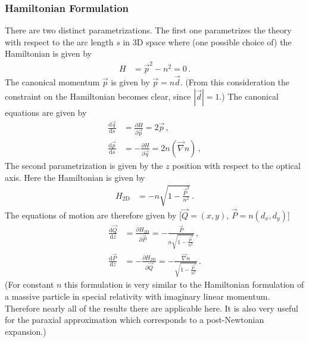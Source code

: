 \documentclass[12pt,a4paper,twoside,openright,BCOR10mm,headsepline,titlepage,abstracton,chapterprefix,final]{scrreprt}
\begin{document}
\subsubsection{Hamiltonian Formulation}
There are two distinct parametrizations. The first one parametrizes the theory with respect to the
arc length $s$ in 3D space where (one possible choice of) the Hamiltonian is given by
\begin{align}
 H &= \vec{p}^2 - n^2 = 0\,.
\end{align}
The canonical momentum $\vec{p}$ is given by $\vec{p} = n \vec{d}$. (From this consideration the constraint on
the Hamiltonian becomes clear, since $|\vec{d}| = 1$.) The canonical equations are given by
\begin{align}
 \frac{\text{d}\vec{q}}{\text{d}s} &= \frac{\partial H}{\partial \vec{p}} = 2 \vec{p}\,,\\
 \frac{\text{d}\vec{p}}{\text{d}s} &= -\frac{\partial H}{\partial \vec{q}} = 2 n (\vec{\nabla} n)\,, 
\end{align}
The second parametrization is given by the $z$ position with respect to the optical axis. Here the Hamiltonian is
given by
\begin{align}
 H_{\text{2D}} &= -n \sqrt{1 - \frac{\vec{P}^2}{n^2}}\,.
\end{align}
The equations of motion are therefore given by [$\vec{Q} = (x,y)$, $\vec{P} = n (d_x, d_y)$]
\begin{align}
 \frac{\text{d}\vec{Q}}{\text{d}z} &= \frac{\partial H_{\text{2D}}}{\partial \vec{P}} = - \frac{\vec{P}}{n \sqrt{1 - \frac{\vec{P}^2}{n^2}}}\,,\\
 \frac{\text{d}\vec{P}}{\text{d}z} &= -\frac{\partial H_{\text{2D}}}{\partial \vec{Q}} = - \frac{\vec{\nabla} n}{\sqrt{1 - \frac{\vec{P}^2}{n^2}}}\,.    
\end{align}
(For constant $n$ this formulation is very similar to the Hamiltonian formulation of a 
massive particle in special relativity with imaginary linear momentum.
Therefore nearly all of the results there are applicable here. It is also very useful 
for the paraxial approximation which corresponds to a post-Newtonian expansion.)
\end{document}
